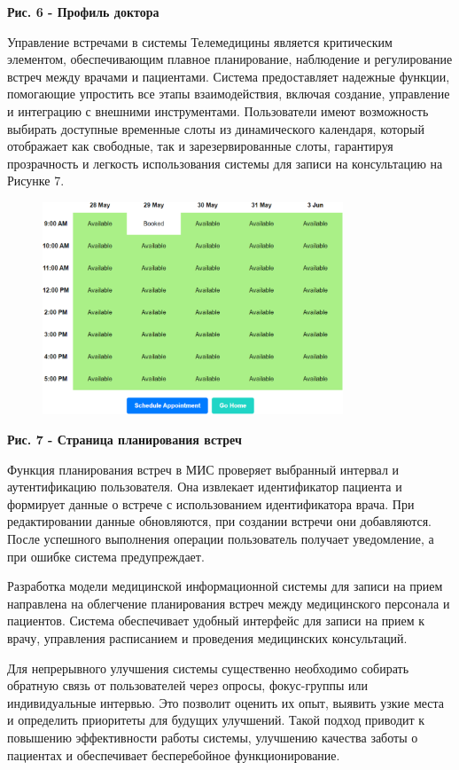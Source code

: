 {\bfseries Рис. 6 - Профиль доктора}

Управление встречами в системы Телемедицины является критическим
элементом, обеспечивающим плавное планирование, наблюдение и
регулирование встреч между врачами и пациентами. Система предоставляет
надежные функции, помогающие упростить все этапы взаимодействия, включая
создание, управление и интеграцию с внешними инструментами. Пользователи
имеют возможность выбирать доступные временные слоты из динамического
календаря, который отображает как свободные, так и зарезервированные
слоты, гарантируя прозрачность и легкость использования системы для
записи на консультацию на Рисунке 7.

\begin{figure}[H]
	\centering
	\includegraphics[width=0.8\textwidth]{assets/157}
	\caption*{}
\end{figure}

{\bfseries Рис. 7 - Страница планирования встреч}

Функция планирования встреч в МИС проверяет выбранный интервал и
аутентификацию пользователя. Она извлекает идентификатор пациента и
формирует данные о встрече с использованием идентификатора врача. При
редактировании данные обновляются, при создании встречи они добавляются.
После успешного выполнения операции пользователь получает уведомление, а
при ошибке система предупреждает.

Разработка модели медицинской информационной системы для записи на прием
направлена на облегчение планирования встреч между медицинского
персонала и пациентов. Система обеспечивает удобный интерфейс для записи
на прием к врачу, управления расписанием и проведения медицинских
консультаций.

Для непрерывного улучшения системы существенно необходимо собирать
обратную связь от пользователей через опросы, фокус-группы или
индивидуальные интервью. Это позволит оценить их опыт, выявить узкие
места и определить приоритеты для будущих улучшений. Такой подход
приводит к повышению эффективности работы системы, улучшению качества
заботы о пациентах и обеспечивает бесперебойное функционирование.

